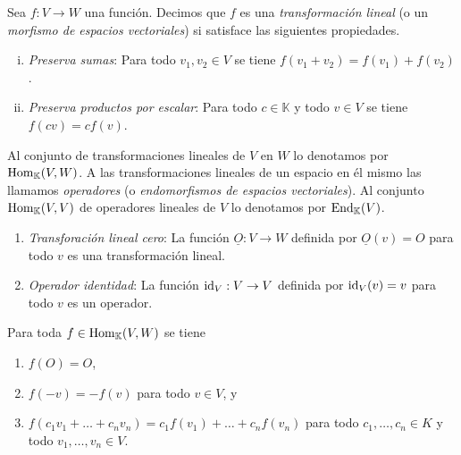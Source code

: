\begin{defn}\label{deftrli}
Sea $f:V\rightarrow W$ una funci\'on. Decimos que $f$ es una \emph{transformaci\'on lineal} (o un \emph{morfismo de espacios vectoriales}) si satisface las siguientes propiedades.
\begin{enumerate}[(i)]
\item \emph{Preserva sumas}: Para todo $v_1,v_2\in V$ se tiene $f(v_1+v_2)=f(v_1)+f(v_2)$.
\item \emph{Preserva productos por escalar}: Para todo $c\in \mathbb{K}$ y todo $v\in V$ se tiene $f(cv)=cf(v)$. 
\end{enumerate}
Al conjunto de transformaciones lineales de $V$ en $W$ lo denotamos por $\operatorname{Hom}_{\mathbb{K}}(V,W)$. A las transformaciones lineales de un espacio en \'el mismo las llamamos \emph{operadores} (o \emph{endomorfismos de espacios vectoriales}). Al conjunto $\operatorname{Hom}_{\mathbb{K}}(V,V)$ de operadores lineales de $V$ lo denotamos por $\operatorname{End}_{\mathbb{K}}(V)$.
\end{defn}

\begin{ejem}
\begin{enumerate}
\item \emph{Transforaci\'on lineal cero}: La funci\'on $\underline{O}:V\rightarrow W$ definida por $\underline{O}(v)=O$ para todo $v$ es una transformaci\'on lineal.
\item \emph{Operador identidad}: La funci\'on $\operatorname{id}_V:V\rightarrow V$ definida por $\operatorname{id}_V(v)=v$ para todo $v$ es un operador.
\end{enumerate}  
\end{ejem}

\begin{prop}\label{proptrlinbasicas}
Para toda $f\in\operatorname{Hom}_{\mathbb{K}}(V,W)$ se tiene
\begin{enumerate}
\item $f(O)=O$,
\item $f(-v)=-f(v)$ para todo $v\in V$, y
\item $f(c_1v_1+\ldots+c_nv_n)=c_1f(v_1)+\ldots+c_nf(v_n)$ para todo $c_1,\ldots,c_n\in K$ y todo $v_1,\ldots,v_n\in V$.
\end{enumerate}
\end{prop}

